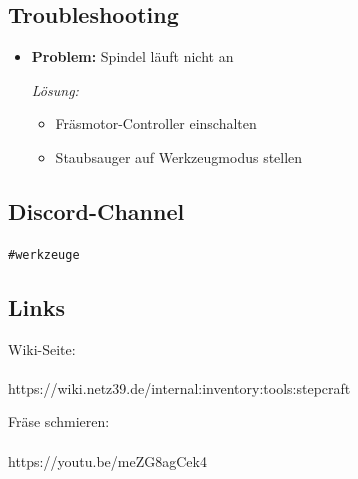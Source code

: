 \documentclass{article}
\begin{document}
	\noindent\dotfill
	\subsection*{Troubleshooting}
	\begin{itemize}
		\item \textbf{Problem:} Spindel läuft nicht an
		\begin{itemize}
			\textit{Lösung:}
			\begin{itemize}
				\item Fräsmotor-Controller einschalten
				\item Staubsauger auf Werkzeugmodus stellen
			\end{itemize}
		\end{itemize}
	\end{itemize}
	
	\noindent\dotfill
	\subsection*{Discord-Channel}
		\colorbox{gray!30}{\texttt{\#werkzeuge}}
	\vspace{1em}\\
	
	\noindent\dotfill
	\subsection*{Links}
	\begin{minipage}{0.45\textwidth}
		\centering
		Wiki-Seite:\\
		\\
		https://wiki.netz39.de/internal:inventory:tools:stepcraft
	\end{minipage}
	\hfill
	\begin{minipage}{0.45\textwidth}
		\centering
		Fräse schmieren:\\
		 \\
		https://youtu.be/meZG8agCek4 \\
	\end{minipage}
	\vspace{1em}
	
\end{document}
